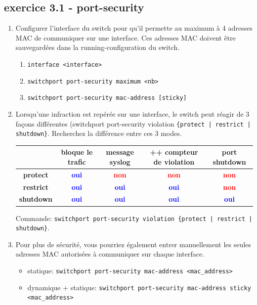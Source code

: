 \documentclass[a4paper]{article}
\begin{document}
\subsection{exercice 3.1 - port-security}





\begin{enumerate}

\item Configurer l’interface du switch pour qu’il permette au maximum à 4 adresses MAC de communiquer sur une interface. Ces adresses MAC doivent être sauvegardées dans la running-configuration du switch.
\begin{enumerate}
    \item \texttt{interface <interface>}
    \item \texttt{switchport port-security maximum <nb>}
    \item \texttt{switchport port-security mac-address [sticky]}
\end{enumerate}

\item  Lorsqu’une infraction est repérée sur une interface, le switch peut réagir de 3 façons différentes (switchport port-security violation \texttt{\{protect | restrict | shutdown\}}. Recherchez la différence entre ces 3 modes.
\begin{center}
    \begin{tabular}{|c|c|c|c|c|} \hline
        & \textbf{bloque le trafic} & \textbf{message syslog} & \textbf{++ compteur de violation} & \textbf{port shutdown} \\ \hline
        \textbf{protect}  & \textcolor{blue}{\textbf{oui}} & \textcolor{red}{\textbf{non}} & \textcolor{red}{\textbf{non}} & \textcolor{red}{\textbf{non}} \\
        \textbf{restrict} & \textcolor{blue}{\textbf{oui}} & \textcolor{blue}{\textbf{oui}} & \textcolor{blue}{\textbf{oui}} & \textcolor{red}{\textbf{non}} \\
        \textbf{shutdown} & \textcolor{blue}{\textbf{oui}} & \textcolor{blue}{\textbf{oui}} & \textcolor{blue}{\textbf{oui}} & \textcolor{blue}{\textbf{oui}} \\ \hline
    \end{tabular}
\end{center}
Commande: \texttt{switchport port-security violation \{protect | restrict | shutdown\}}.

\item Pour plus de sécurité, vous pourriez également entrer manuellement les seules adresses MAC autorisées à communiquer sur chaque interface.
\begin{itemize}
    \item statique: \texttt{switchport port-security mac-address <mac\_address>}
    \item dynamique + statique: \texttt{switchport port-security mac-address sticky <mac\_address>}
\end{itemize}


\end{enumerate}
\end{document}
